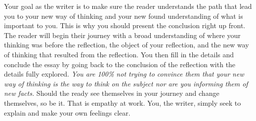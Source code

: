 \documentclass[nobib]{tufte-handout}
\begin{document}
Your goal as the writer is to make sure the reader understands the path that lead you to your new way of thinking and your new found understanding of what is important to you. This is why you should present the conclusion right up front. The reader will begin their journey with a broad understanding of  where your thinking was before the reflection, the object of your reflection, and the new way of thinking that resulted from the reflection. You then fill in the details and conclude the essay by going back to the conclusion of the reflection with the details fully explored. \textit{You are 100\% not trying to convince them that your new way of thinking is \textit{the} way to think on the subject nor are you informing them of new facts.} Should the ready see themselves in your journey and change themselves, so be it. That is empathy at work. You, the writer, simply seek to explain and make your own feelings clear. 
\end{document}
